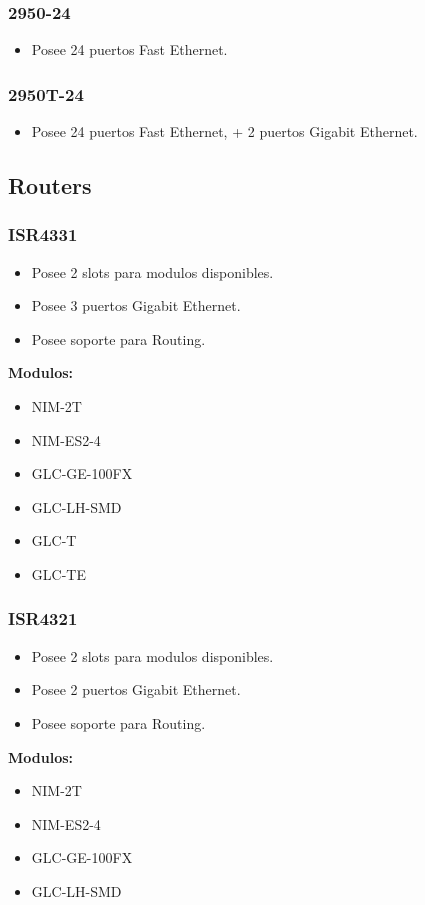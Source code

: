 \documentclass{article}
\begin{document}
\subsubsection{2950-24}
\begin{itemize}
    \item Posee 24 puertos Fast Ethernet.
\end{itemize}

\subsubsection{2950T-24} 
\begin{itemize}
    \item Posee 24 puertos Fast Ethernet, + 2 puertos Gigabit Ethernet.
\end{itemize}

\textbf{}

\subsection{Routers}

\subsubsection{ISR4331}
\begin{itemize}
    \item Posee 2 slots para modulos disponibles.
    \item Posee 3 puertos Gigabit Ethernet.
    \item Posee soporte para Routing.
\end{itemize}
\textbf{Modulos:}
\begin{itemize}
    \item NIM-2T
    \item NIM-ES2-4
    \item GLC-GE-100FX
    \item GLC-LH-SMD
    \item GLC-T
    \item GLC-TE
\end{itemize}

\subsubsection{ISR4321}
\begin{itemize}
    \item Posee 2 slots para modulos disponibles.
    \item Posee 2 puertos Gigabit Ethernet.
    \item Posee soporte para Routing.
\end{itemize}
\textbf{Modulos:}
\begin{itemize}
    \item NIM-2T
    \item NIM-ES2-4
    \item GLC-GE-100FX
    \item GLC-LH-SMD
\end{itemize}
\end{document}
